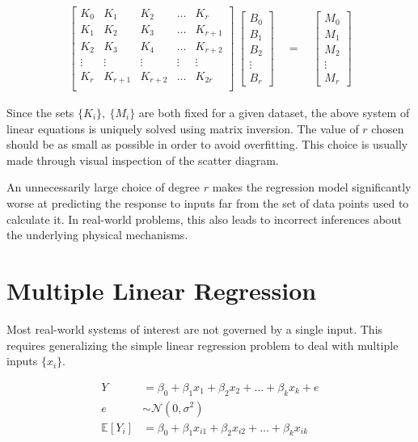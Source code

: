 \begin{align}
	\begin{bmatrix}
		K_0 & K_1 & K_2 & \dots & K_r\\
		K_1 & K_2 & K_3 & \dots & K_{r+1}\\
		K_2 & K_3 & K_4 & \dots & K_{r+2}\\
		\vdots & \vdots & \vdots & \vdots & \vdots \\
		K_r & K_{r+1} & K_{r+2} & \dots & K_{2r}\\
	\end{bmatrix} 
	\ 
	\begin{bmatrix}
		B_0 \\
		B_1 \\
		B_2 \\
		\vdots \\
		B_r
	\end{bmatrix}
	\quad = \quad  
	\begin{bmatrix}
		M_0 \\
		M_1 \\
		M_2 \\
		\vdots \\
		M_r
	\end{bmatrix}
\end{align}

Since the sets $ \{K_i\},\ \{M_i\} $ are both fixed for a given dataset, the above system of linear equations is uniquely solved using matrix inversion. The value of $ r $ chosen should be as small as possible in order to avoid overfitting. This choice is usually made through visual inspection of the scatter diagram.

An unnecessarily large choice of degree $ r $ makes the regression model significantly worse at predicting the response to inputs far from the set of data points used to calculate it. In real-world problems, this also leads to incorrect inferences about the underlying physical mechanisms.

\section{Multiple Linear Regression}

Most real-world systems of interest are not governed by a single input. This requires generalizing the simple linear regression problem to deal with multiple inputs $ \{x_i\} $.

\begin{align}
	Y &= \beta_0 + \beta_1 x_1 + \beta_2 x_2 + \dots + \beta_k x_k + e \\
	e &\sim \mathcal{N}(0, \sigma^2) \nonumber \\
	\mathbb{E}[Y_i] &= \beta_0 + \beta_1 x_{i1} + \beta_2 x_{i2} + \dots + \beta_k x_{ik} \nonumber
\end{align}

